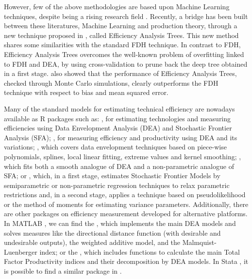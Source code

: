 However, few of the above methodologies are based upon Machine Learning
techniques, despite being a rising research field
\citetext{\citealp[see, for example, the recent papers
by][]{khezrimotlagh2019}; \citealp[and][]{zhu2019}; \citealp[or the book
by][]{charles2020}}. Recently, a bridge has been built between these
literatures, Machine Learning and production theory, through a new
technique proposed in \citet{esteve2020}, called Efficiency Analysis
Trees. This new method shares some similarities with the standard FDH
technique. In contrast to FDH, Efficiency Analysis Trees overcomes the
well-known problem of overfitting linked to FDH and DEA, by using
cross-validation to prune back the deep tree obtained in a first stage.
\citet{esteve2020} also showed that the performance of Efficiency
Analysis Trees, checked through Monte Carlo simulations, clearly
outperforms the FDH technique with respect to bias and mean squared
error.

Many of the standard models for estimating technical efficiency are
nowadays available as R packages such as: 
\citep{benchmarking}, for estimating technologies and measuring
efficiencies using Data Envelopment Analysis (DEA) and Stochastic
Frontier Analysis (SFA);  \citep{nonparaeff}, for
measuring efficiency and productivity using DEA and its variations;
 \citep{npbr}, which covers data envelopment techniques
based on piece-wise polynomials, splines, local linear fitting, extreme
values and kernel smoothing;  \citep{snfa}, which fits
both a smooth analogue of DEA and a non-parametric analogue of SFA; or
 \citep{semsfa}, which, in a first stage, estimates
Stochastic Frontier Models by semiparametric or non-parametric
regression techniques to relax parametric restrictions and, in a second
stage, applies a technique based on pseudolikelihood or the method of
moments for estimating variance parameters. Additionally, there are
other packages on efficiency measurement developed for alternative
platforms. In MATLAB \citep{Matlab}, we can find the
 \citep{alvarez2020}, which
implements the main DEA models and solves measures like the directional
distance function (with desirable and undesirable outputs), the weighted
additive model, and the Malmquist-Luenberger index; or the
 \citep{balk2018}, which includes
functions to calculate the main Total Factor Productivity indices and
their decomposition by DEA models. In Stata \citep{stata}, it is
possible to find a similar package in \citet{ji2010}.

